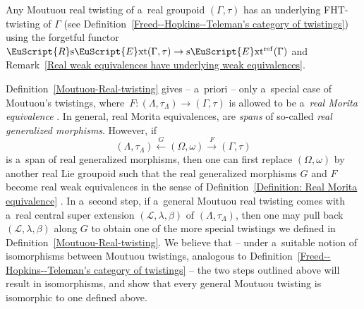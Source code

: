 \documentclass[10pt,a4paper]{amsart}
\numberwithin{equation}{section}
\def\mathscr#1{\EuScript{#1}}
\def\sExt{\normalfont\text{s}\mathscr{E}\text{xt}}
\def\RsExt{\normalfont\mathscr{R}\text{s}\mathscr{E}\text{xt}}
\begin{document}
\begin{Remark} \label{Remark: Real twistings have underlying FHT twistings}
 Any Moutuou real twisting of a~real groupoid $(\Gamma,\tau)$ has an underlying FHT-twisting of $\Gamma$ (see Definition~\ref{Freed--Hopkins--Teleman's category of twistings})
 using the forgetful functor $\RsExt(\Gamma,\tau) \to \sExt^{\mathrm{ref}}(\Gamma)$ and Remark~\ref{Real weak equivalences have underlying weak equivalences}.
\end{Remark}

\begin{Remark}
 Definition~\ref{Moutuou-Real-twisting} gives -- a~priori -- only a~special case of Moutuou's twistings, where~${F\colon (\Lambda,\tau_{\Lambda}) \to (\Gamma,\tau)}$ is allowed to be a~\emph{real Morita equivalence} \cite[Definitions~2.4.1 and~2.6.3]{mohamedmoutuou2012}.
In general, real Morita equivalences, are \emph{spans} of so-called \emph{real generalized morphisms}. However, if
\begin{equation*}
(\Lambda,\tau_{\Lambda}) \stackrel G\leftarrow (\Omega,\omega) \stackrel F\to (\Gamma,\tau)
\end{equation*}
is a~span of real generalized morphisms, then one can first replace $(\Omega,\omega)$ by another real Lie groupoid such that the real generalized morphisms $G$ and $F$ become real weak equivalences in the sense of Definition~\ref{Definition: Real Morita equivalence} \cite[Proposition~2.4.9]{mohamedmoutuou2012}.
In a~second step, if a~general Moutuou real twisting comes with a~real central super extension $(\mathcal{L},\lambda,\beta)$ of $(\Lambda,\tau_{\Lambda})$, then one may pull back~${(\mathcal{L},\lambda,\beta)}$ along $G$ to obtain one of the more special twistings we defined in Definition~\ref{Moutuou-Real-twisting}. We believe that -- under a~suitable notion of isomorphisms between Moutuou twistings, analogous to Definition~\ref{Freed--Hopkins--Teleman's category of twistings} -- the two steps outlined above will result in isomorphisms, and show that every general Moutuou twisting is isomorphic to one defined above.
\end{Remark}
\end{document}
